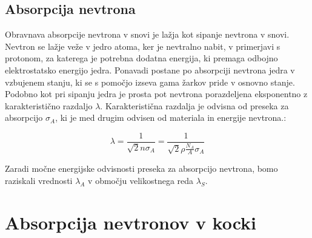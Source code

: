 \documentclass[slovene,11pt,a4paper]{article}
\numberwithin{equation}{section} %
\numberwithin{figure}{section} %
\numberwithin{table}{section} %
\begin{document}
\subsection{Absorpcija nevtrona}

Obravnava absorpcije nevtrona v snovi je lažja kot sipanje nevtrona v snovi. Nevtron se lažje veže v jedro atoma, ker je nevtralno nabit, v primerjavi s protonom, za katerega je potrebna dodatna energija, ki premaga odbojno elektrostatsko energijo jedra. Ponavadi postane po absorpciji nevtrona jedra v vzbujenem stanju, ki se s pomočjo izseva gama žarkov pride v osnovno stanje. Podobno kot pri sipanju jedra je prosta pot nevtrona porazdeljena eksponentno z karakteristično razdaljo $\lambda$. Karakteristična razdalja je odvisna od preseka za absorpcijo $\sigma_A$, ki je med drugim odvisen od materiala in energije nevtrona.:


\begin{equation}
\lambda = \frac{1}{\sqrt{2} n \sigma_A} = \frac{1}{\sqrt{2} \rho \frac{N_A}{A} \sigma_A}
\end{equation}

Zaradi močne energijske odvisnosti preseka za absorpcijo nevtrona, bomo raziskali vrednosti $\lambda_A$ v območju velikostnega reda $\lambda_S$.

\section{Absorpcija nevtronov v kocki}
\end{document}
